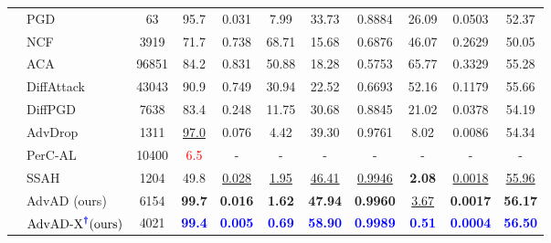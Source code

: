 \documentclass{article}
\begin{document}
\begin{table}[t]
{\begin{tabular}{clccccccccc}
        \midrule
                                    & PGD \cite{madry2018towards}           & 63        & {95.7}      & {0.031}     & 7.99      & 33.73     & 0.8884    & 26.09     & 0.0503    & 52.37 \\
                                    & NCF \cite{yuan2022natural}           & 3919      & 71.7       & 0.738         & 68.71     & 15.68     & 0.6876   & 46.07   & 0.2629   & 50.05   \\
                                    & ACA \cite{chen2024content}           & 96851      & 84.2      & 0.831         & 50.88     & 18.28     & 0.5753   & 65.77   & 0.3329   & 55.28   \\
                                    & DiffAttack \cite{chen2023diffusion}    & 43043     & 90.9      & 0.749     & 30.94     & 22.52     & 0.6693    & 52.16     & 0.1179    & 55.66 \\
                                    & DiffPGD \cite{xue2023diffusion}       & 7638      & 83.4      & 0.248     & 11.75     & 30.68     & 0.8845    & 21.02     & 0.0378    & 54.19 \\
                                    & AdvDrop \cite{duan2021advdrop}       & 1311       & \underline{97.0}      & 0.076     & 4.42      & 39.30     & 0.9761    & 8.02      & 0.0086    & 54.34 \\
                                    & PerC-AL \cite{zhao2020towards}       & 10400      & \textcolor{red}{6.5}  & -         & -        & -          & -         & -         & -         & - \\
                                    & SSAH \cite{luo2022frequency}          & 1204      & 49.8      & \underline{0.028}     & \underline{1.95}      & \underline{46.41}     & \underline{0.9946}    & \textbf{2.08}      & \underline{0.0018}    & \underline{55.96} \\
        \cmidrule(lr){2-11}
                                    & AdvAD (ours)        & 6154      & \textbf{99.7}     & \textbf{0.016}     & \textbf{1.62}      & \textbf{47.94}     & \textbf{0.9960}    & \underline{3.67}      & \textbf{0.0017}    & \textbf{56.17} \\
                                    & $\text{AdvAD-X}^{\textcolor{blue}{\boldsymbol{\dag}}} \text{(ours)}$ & 4021    & \textcolor{blue}{\textbf{99.4}}      & \textcolor{blue}{\textbf{0.005}}     & \textcolor{blue}{\textbf{0.69}}      & \textcolor{blue}{\textbf{58.90}}     & \textcolor{blue}{\textbf{0.9989}}    & \textcolor{blue}{\textbf{0.51}}      & \textcolor{blue}{\textbf{0.0004}}    & \textcolor{blue}{\textbf{56.50}} \\
        \bottomrule
    \end{tabular}}
    \vspace{-0.4cm}
\end{table}
\end{document}
